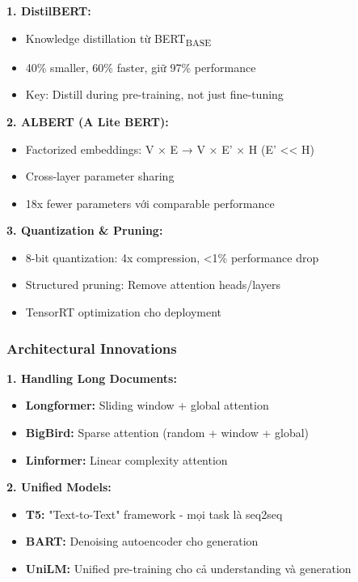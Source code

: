 \textbf{1. DistilBERT:}
\begin{itemize}
    \item Knowledge distillation từ BERT\textsubscript{BASE}
    \item 40\% smaller, 60\% faster, giữ 97\% performance
    \item Key: Distill during pre-training, not just fine-tuning
\end{itemize}

\textbf{2. ALBERT (A Lite BERT):}
\begin{itemize}
    \item Factorized embeddings: V × E → V × E' × H (E' << H)
    \item Cross-layer parameter sharing
    \item 18x fewer parameters với comparable performance
\end{itemize}

\textbf{3. Quantization \& Pruning:}
\begin{itemize}
    \item 8-bit quantization: 4x compression, <1\% performance drop
    \item Structured pruning: Remove attention heads/layers
    \item TensorRT optimization cho deployment
\end{itemize}

\subsubsection{Architectural Innovations}

\textbf{1. Handling Long Documents:}
\begin{itemize}
    \item \textbf{Longformer:} Sliding window + global attention
    \item \textbf{BigBird:} Sparse attention (random + window + global)
    \item \textbf{Linformer:} Linear complexity attention
\end{itemize}

\textbf{2. Unified Models:}
\begin{itemize}
    \item \textbf{T5:} "Text-to-Text" framework - mọi task là seq2seq
    \item \textbf{BART:} Denoising autoencoder cho generation
    \item \textbf{UniLM:} Unified pre-training cho cả understanding và generation
\end{itemize}

